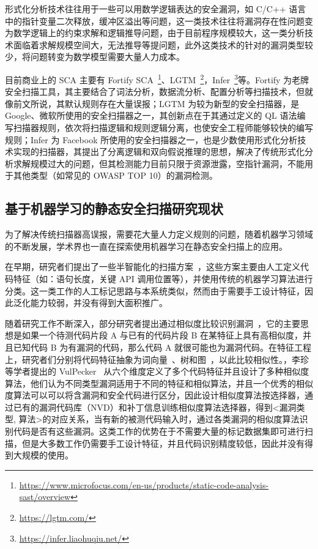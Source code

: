 形式化分析技术往往用于一些可以用数学逻辑表达的安全漏洞，如 C/C++ 语言中的指针变量二次释放，缓冲区溢出等问题，这一类技术往往将漏洞存在性问题变为数学逻辑上的约束求解和逻辑推导问题，由于目前程序规模较大，这一类分析技术面临着求解规模空间大，无法推导等提问题，此外这类技术的针对的漏洞类型较少，将问题转变为数学模型需要大量人力成本。

目前商业上的 SCA 主要有 Fortify SCA~\footnote{\url{https://www.microfocus.com/en-us/products/static-code-analysis-sast/overview}}、LGTM~\footnote{\url{https://lgtm.com/}}，Infer~\footnote{\url{https://infer.liaohuqiu.net/}}等。Fortify 为老牌安全扫描工具，其主要结合了词法分析，数据流分析、配置分析等扫描技术，但就像前文所说，其默认规则存在大量误报；LGTM 为较为新型的安全扫描器，是 Google、微软所使用的安全扫描器之一，其创新点在于其通过定义的 QL 语法编写扫描器规则，依次将扫描逻辑和规则逻辑分离，也使安全工程师能够较快的编写规则；Infer 为 Facebook 所使用的安全扫描器之一，也是少数使用形式化分析技术实现的扫描器，其提出了分离逻辑和双向假说推理的思想，解决了传统形式化分析求解规模过大的问题，但其检测能力目前只限于资源泄露，空指针漏洞，不能用于其他类型（如常见的 OWASP TOP 10）的漏洞检测。\\

\subsection{基于机器学习的静态安全扫描研究现状}

为了解决传统扫描器高误报，需要花大量人力定义规则的问题，随着机器学习领域的不断发展，学术界也一直在探索使用机器学习在静态安全扫描上的应用。

在早期，研究者们提出了一些半智能化的扫描方案~\cite{aletheia,zranking,ayukselCaseStudy}，这些方案主要由人工定义代码特征（如：语句长度，关键 API 调用位置等），并使用传统的机器学习算法进行分类。这一类工作的人工标记思路与本系统类似，然而由于需要手工设计特征，因此泛化能力较弱，并没有得到大面积推广。

随着研究工作不断深入，部分研究者提出通过相似度比较识别漏洞~\cite{vuddy,li2016vulpecker}，它的主要思想是如果一个待测代码片段 A 与已有的代码片段 B 在某特征上具有高相似度，并且已知代码 B 为有漏洞的代码，那么代码 A 就很可能也为漏洞代码。在特征工程上，研究者们分别将代码特征抽象为词向量~\cite{vuddy}、树和图~\cite{simtree}，以此比较相似性。，李珍等学者提出的 VulPecker~\cite{li2016vulpecker} 从六个维度定义了多个代码特征并且设计了多种相似度算法，他们认为不同类型漏洞适用于不同的特征和相似算法，并且一个优秀的相似度算法可以可以将含漏洞和安全代码进行区分，因此设计相似度算法按选择器，通过已有的漏洞代码库（NVD）和补丁信息训练相似度算法选择器，得到<漏洞类型, 算法>的对应关系，当有新的被测代码输入时，通过各类漏洞的相似度算法识别代码是否有这些漏洞。这类工作的优势在于不需要大量的标记数据集即可进行扫描，但是大多数工作仍需要手工设计特征，并且代码识别精度较低，因此并没有得到大规模的使用。

